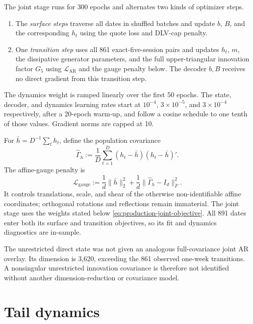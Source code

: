 \documentclass[11pt,a4paper]{article}
\begin{document}
The joint stage runs for 300 epochs and alternates two kinds of optimizer
steps.
\begin{enumerate}
  \item The \emph{surface steps} traverse all dates in shuffled batches and
        update $b$, $B$, and the corresponding $h_t$ using the quote loss and
        DLV-cap penalty.
  \item One \emph{transition step} uses all 861 exact-five-session pairs and updates
        $h_t$, $m$, the dissipative generator parameters, and the full
        upper-triangular innovation factor $G_5$ using
        $\mathcal L_{\mathrm{AR}}$ and the gauge penalty below.  The decoder
        $b,B$ receives no direct gradient from this transition step.
\end{enumerate}
The dynamics weight is ramped linearly over the first 50 epochs.  The state,
decoder, and dynamics learning rates start at $10^{-4}$, $3\times10^{-5}$,
and $3\times10^{-4}$ respectively, after a 20-epoch warm-up, and follow a
cosine schedule to one tenth of those values.  Gradient norms are capped at
10.

For $\bar h=D^{-1}\sum_t h_t$, define the population covariance
\begin{equation}
  \widehat\Gamma_h
  :=\frac1D\sum_{t=1}^{D}(h_t-\bar h)(h_t-\bar h)'.
\end{equation}
The affine-gauge penalty is
\begin{equation}
  \mathcal L_{\mathrm{gauge}}
  :=\frac1d\lVert\bar h\rVert_2^2
    +\frac1d\lVert\widehat\Gamma_h-I_d\rVert_F^2.
  \label{eq:affine-gauge-penalty}
\end{equation}
It controls translations, scale, and shear of the otherwise non-identifiable
affine coordinates; orthogonal rotations and reflections remain immaterial.
The joint stage uses the weights stated below
\eqref{eq:production-joint-objective}.  All 891 dates enter both its surface
and transition objectives, so its fit and dynamics diagnostics are in-sample.

The unrestricted direct state was not given an analogous full-covariance
joint AR overlay.  Its dimension is 3,620, exceeding the 861 observed
one-week transitions.  A nonsingular unrestricted innovation covariance is
therefore not identified without another dimension-reduction or covariance
model.


\section{Tail dynamics}\label{app:tail-dynamics}
\end{document}
